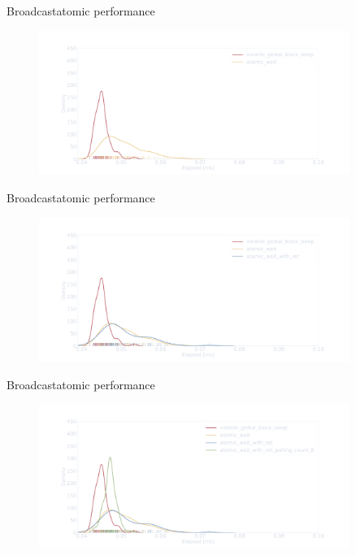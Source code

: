 \documentclass[aspectratio=169,compress]{beamer}
\begin{document}
\begin{frame}[fragile]{Broadcast}{atomic performance}
\centering
	\begin{figure}
		\includegraphics[width=0.9\textwidth]{density_atom_02.pdf}
	\end{figure}
\end{frame}

\begin{frame}[fragile]{Broadcast}{atomic performance}
\centering
	\begin{figure}
		\includegraphics[width=0.9\textwidth]{density_atom_03.pdf}
	\end{figure}
\end{frame}

\begin{frame}[fragile]{Broadcast}{atomic performance}
\centering
	\begin{figure}
		\includegraphics[width=0.9\textwidth]{density_atom_04.pdf}
	\end{figure}
\end{frame}
\end{document}
